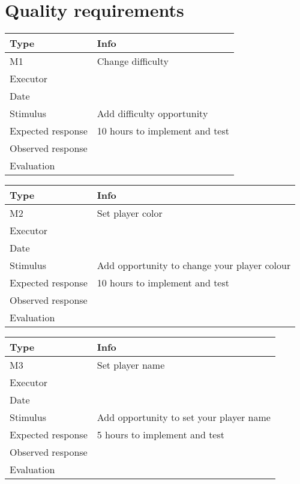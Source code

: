 \vspace{0.5em}




\section{Quality requirements}
\noindent
\begin{tabular}{|p{3cm}|p{8.5cm}|}
	\hline
	\bf{Type}	& \bf{Info} \\
	\hline
	M1			& Change difficulty \\
	Executor	&  \\
	Date		& \date{\today} \\
	Stimulus	& Add difficulty opportunity \\
	Expected response & 10 hours to implement and test \\
	Observed response & \\
	Evaluation	& \\
	\hline
\end{tabular}

\vspace{0.5em}

\noindent
\begin{tabular}{|p{3cm}|p{8.5cm}|}
	\hline
	\bf{Type}	& \bf{Info} \\
	\hline
	M2			& Set player color \\
	Executor	&  \\
	Date		& \date{\today} \\
	Stimulus	& Add opportunity to change your player colour \\
	Expected response & 10 hours to implement and test\\
	Observed response & \\
	Evaluation	& \\
	\hline
\end{tabular}

\vspace{0.5em}

\noindent
\begin{tabular}{|p{3cm}|p{8.5cm}|}
	\hline
	\bf{Type}	& \bf{Info} \\
	\hline
	M3			& Set player name \\
	Executor	&  \\
	Date		& \date{\today} \\
	Stimulus	& Add opportunity to set your player name \\
	Expected response & 5 hours to implement and test\\
	Observed response & \\
	Evaluation	&  \\
	\hline
\end{tabular}

